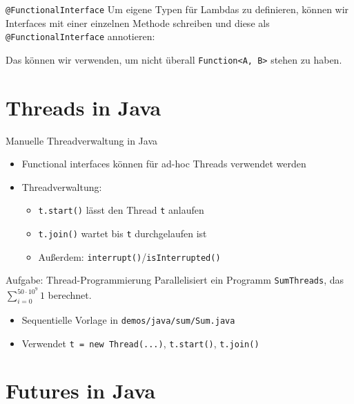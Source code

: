 \documentclass{beamer}
\newcommand{\code}[1]{
	\begin{mdframed}
		
	\end{mdframed}
}
\begin{document}
\begin{frame}{\texttt{@FunctionalInterface}}
  Um eigene Typen für Lambdas zu definieren, können wir Interfaces mit einer einzelnen Methode schreiben und diese als \texttt{@FunctionalInterface} annotieren:

  \code{code/myfuncinterface.java}

  Das können wir verwenden, um nicht überall \texttt{Function<A, B>} stehen zu haben.
\end{frame}

\section{Threads in Java}

\begin{frame}{Manuelle Threadverwaltung in Java}
  \code{code/runnable.java}

  \begin{itemize}
    \item Functional interfaces können für ad-hoc Threads verwendet werden
    \item Threadverwaltung:
    \begin{itemize}
      \item \texttt{t.start()} lässt den Thread \texttt{t} anlaufen
      \item \texttt{t.join()} wartet bis \texttt{t} durchgelaufen ist
      \item Außerdem: \texttt{interrupt()}/\texttt{isInterrupted()}
    \end{itemize}
  \end{itemize}
\end{frame}

\begin{frame}{Aufgabe: Thread-Programmierung}
    Parallelisiert ein Programm \texttt{SumThreads}, das $\sum^{50 \cdot 10^9}_{i = 0} 1$ berechnet.

    \begin{itemize}
        \item Sequentielle Vorlage in \texttt{demos/java/sum/Sum.java}
        \item Verwendet \texttt{t = new Thread(...)}, \texttt{t.start()}, \texttt{t.join()}
    \end{itemize}
\end{frame}

\section{Futures in Java}
\end{document}
